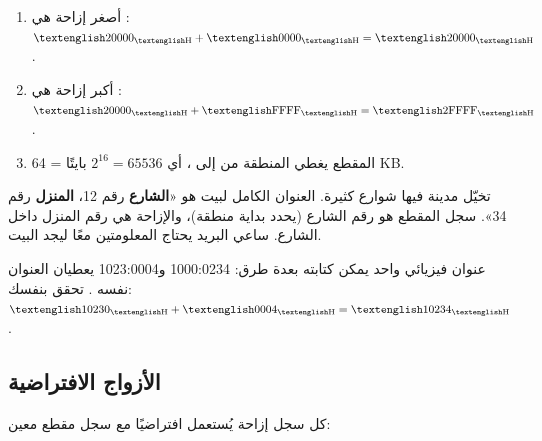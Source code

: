 \begin{khatwa}[: ما المنطقة التي يغطيها المقطع \textenglish{DS = 2000H}؟]
    \begin{enumerate}
        \item أصغر إزاحة هي : $\hex{20000} + \hex{0000} = \hex{20000}$.
        \item أكبر إزاحة هي : $\hex{20000} + \hex{FFFF} = \hex{2FFFF}$.
        \item المقطع يغطي المنطقة من  إلى ، أي $2^{16} = 65536$ بايتًا = \textenglish{64 KB}.
    \end{enumerate}
\end{khatwa}

\begin{tashbih}
    تخيّل مدينة فيها شوارع كثيرة. العنوان الكامل لبيت هو «\textbf{الشارع} رقم 12، \textbf{المنزل} رقم 34».
    سجل المقطع هو رقم الشارع (يحدد بداية منطقة)، والإزاحة هي رقم المنزل داخل الشارع. ساعي البريد يحتاج
    المعلومتين معًا ليجد البيت.
\end{tashbih}

\begin{center}
\end{center}

\begin{intabih}
    عنوان فيزيائي واحد يمكن كتابته بعدة طرق: \textenglish{1000:0234} و\textenglish{1023:0004} يعطيان
    العنوان نفسه . تحقق بنفسك: $\hex{10230} + \hex{0004} = \hex{10234}$.
\end{intabih}

\subsection{الأزواج الافتراضية}
كل سجل إزاحة يُستعمل افتراضيًا مع سجل مقطع معين:

